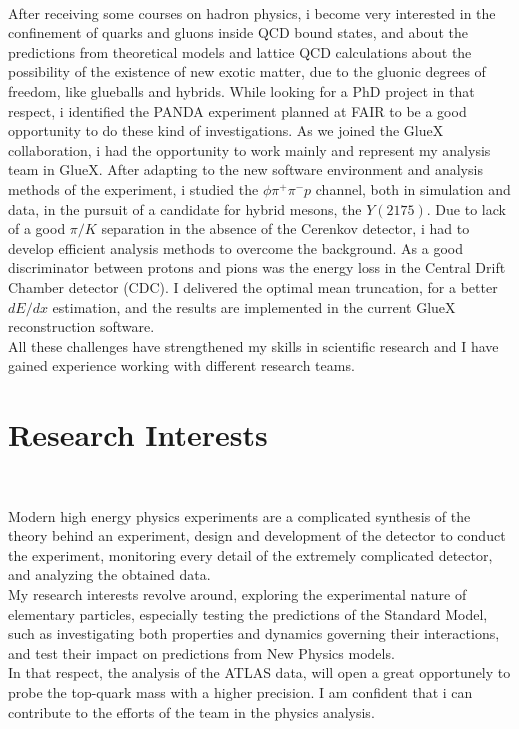 \documentclass[a4paper,roman]{article}
\begin{document}
~\par After receiving some courses on hadron physics, i become very interested in the confinement of quarks and gluons inside QCD bound states, and about the predictions from theoretical models and lattice QCD calculations about the possibility of the existence of new exotic matter, due to the gluonic degrees of freedom, like glueballs and hybrids. While looking for a PhD project in that respect, i identified the PANDA experiment planned at FAIR to be a good opportunity to do these kind of investigations. As we joined the GlueX collaboration, i had the opportunity to work mainly and represent my analysis team in GlueX. After adapting to the new software environment and analysis methods of the experiment, i studied the $\phi\pi^{+}\pi^{-}p$ channel, both in simulation and data, in the pursuit of a candidate for hybrid mesons, the $Y(2175)$. Due to lack of a good $\pi/K$ separation in the absence of the Cerenkov detector, i had to develop efficient analysis methods to overcome the background. As a good discriminator between protons and pions was the energy loss in the Central Drift Chamber detector (CDC). I delivered the optimal mean truncation, for a better $dE/dx$ estimation, and the results are implemented in the current GlueX reconstruction software.\\
All these challenges have strengthened my skills in scientific research and I have gained experience working with different research teams.

\section*{Research Interests}
~\par Modern high energy physics experiments are a complicated synthesis of the theory behind an experiment, design and development of the detector to conduct the experiment, monitoring every detail of the extremely complicated detector, and analyzing the obtained data.\\
My research interests revolve around, exploring the experimental nature of elementary particles, especially testing the predictions of the Standard Model, such as investigating both properties and dynamics governing their interactions, and test their impact on predictions from New Physics models.\\
In that respect, the analysis of the ATLAS data, will open a great opportunely to probe the top-quark mass with a higher precision. I am confident that i can contribute to the efforts of the team in the physics analysis.
\end{document}
